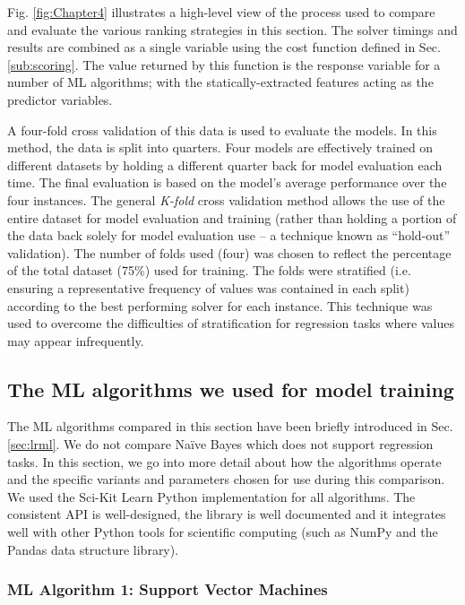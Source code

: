 Fig. \ref{fig:Chapter4} illustrates a high-level view of the process used to compare and evaluate the various ranking strategies in this section. 
The solver timings and results are combined as a single variable using the cost function defined in Sec. \ref{sub:scoring}.
The value returned by this function is the response variable for a number of ML algorithms; with the statically-extracted features acting as the predictor variables.

A four-fold cross validation of this data is used to evaluate the models. 
In this method, the data is split into quarters.
Four models are effectively trained on different datasets by holding a different quarter back for model evaluation each time.
The final evaluation is based on the model's average performance over the four instances.
The general \textit{K-fold} cross validation method allows the use of the entire dataset for model evaluation and training (rather than holding a portion of the data back solely for model evaluation use -- a technique known as ``hold-out'' validation). 
The number of folds used (four) was chosen to reflect the percentage of the total dataset (75\%) used for training. 
The folds were stratified (i.e. ensuring a representative frequency of values was contained in each split) according to the best performing solver for each instance.
This technique was used to overcome the difficulties of stratification for regression tasks where values may appear infrequently.  

\subsection{The ML algorithms we used for model training}

\label{sub:MLalgorithms}
The ML algorithms compared in this section have been briefly introduced in Sec. \ref{sec:lrml}. 
We do not compare Na\"ive Bayes which does not support regression tasks. 
In this section, we go into more detail about how the algorithms operate and the specific variants and parameters chosen for use during this comparison.
We used the Sci-Kit Learn \cite{sklearn} Python implementation for all algorithms.
The consistent API is well-designed, the library is well documented and it integrates well with other Python tools for scientific computing (such as NumPy and the Pandas data structure library).


\subsubsection{ML Algorithm 1: Support Vector Machines}

